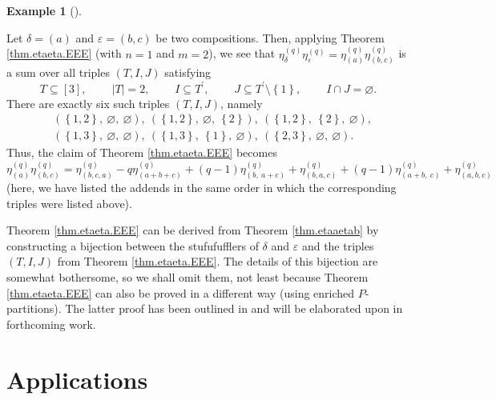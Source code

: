\documentclass[numbers=enddot,12pt,final,onecolumn,notitlepage]{scrartcl}%
\theoremstyle{definition}
\newtheorem{exam}[theo]{Example}
\newenvironment{example}[1][]
{\begin{exam}[#1]\begin{leftbar}}
{\end{leftbar}\end{exam}}
\begin{document}
\begin{example}
Let $\delta=\left(  a\right)  $ and $\varepsilon=\left(  b,c\right)  $ be two
compositions. Then, applying Theorem \ref{thm.etaeta.EEE} (with $n=1$ and
$m=2$), we see that $\eta_{\delta}^{(q)}\eta_{\varepsilon}^{(q)}=\eta_{\left(
a\right)  }^{(q)}\eta_{\left(  b,c\right)  }^{(q)}$ is a sum over all triples
$\left(  T,I,J\right)  $ satisfying%
\[
T\subseteq\left[  3\right]  ,\ \ \ \ \ \ \ \ \ \ \left\vert T\right\vert
=2,\ \ \ \ \ \ \ \ \ \ I\subseteq T^{\prime},\ \ \ \ \ \ \ \ \ \ J\subseteq
T^{\prime}\setminus\left\{  1\right\}  ,\ \ \ \ \ \ \ \ \ \ I\cap
J=\varnothing.
\]
There are exactly six such triples $\left(  T,I,J\right)  $, namely%
\begin{align*}
&  \left(  \left\{  1,2\right\}  ,\ \varnothing,\ \varnothing\right)
,\ \left(  \left\{  1,2\right\}  ,\ \varnothing,\ \left\{  2\right\}  \right)
,\ \left(  \left\{  1,2\right\}  ,\ \left\{  2\right\}  ,\ \varnothing\right)
,\\
&  \left(  \left\{  1,3\right\}  ,\ \varnothing,\ \varnothing\right)
,\ \left(  \left\{  1,3\right\}  ,\ \left\{  1\right\}  ,\ \varnothing\right)
,\ \left(  \left\{  2,3\right\}  ,\ \varnothing,\ \varnothing\right)  .
\end{align*}
Thus, the claim of Theorem \ref{thm.etaeta.EEE} becomes%
\[
\eta_{\left(  a\right)  }^{\left(  q\right)  }\eta_{\left(  b,c\right)
}^{\left(  q\right)  }=\eta_{\left(  b,c,a\right)  }^{\left(  q\right)
}-q\eta_{\left(  a+b+c\right)  }^{\left(  q\right)  }+\left(  q-1\right)
\eta_{\left(  b,\ a+c\right)  }^{\left(  q\right)  }+\eta_{\left(
b,a,c\right)  }^{\left(  q\right)  }+\left(  q-1\right)  \eta_{\left(
a+b,\ c\right)  }^{\left(  q\right)  }+\eta_{\left(  a,b,c\right)  }^{\left(
q\right)  }%
\]
(here, we have listed the addends in the same order in which the corresponding
triples were listed above).
\end{example}

Theorem \ref{thm.etaeta.EEE} can be derived from Theorem \ref{thm.etaaetab} by
constructing a bijection between the stufufufflers of $\delta$ and
$\varepsilon$ and the triples $\left(  T,I,J\right)  $ from Theorem
\ref{thm.etaeta.EEE}. The details of this bijection are somewhat bothersome,
so we shall omit them, not least because Theorem \ref{thm.etaeta.EEE} can also
be proved in a different way (using enriched $P$-partitions). The latter proof
has been outlined in \cite[Corollary 1]{GriVas22} and will be elaborated upon
in forthcoming work.

\section{\label{sec.app}Applications}
\end{document}
